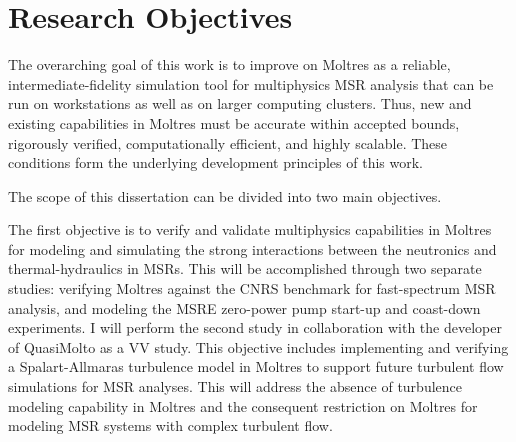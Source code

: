 
\section{Research Objectives}

The overarching goal of this work is to improve on Moltres as a reliable, intermediate-fidelity
simulation tool for multiphysics \gls{MSR} analysis that can be run on workstations as well as on
larger computing clusters. Thus, new and existing capabilities in Moltres must
be accurate within accepted bounds, rigorously verified, computationally efficient, and highly
scalable. These conditions form the underlying development principles of this work.

The scope of this dissertation can be divided into two main objectives.
%

    The first objective is to verify and validate multiphysics capabilities in Moltres for
    modeling and simulating
    the strong interactions between the neutronics and thermal-hydraulics in \glspl{MSR}. This
    will be accomplished through two separate studies: verifying Moltres against the CNRS
    benchmark \cite{tiberga_results_2020} for fast-spectrum \gls{MSR} analysis, and modeling the
    \gls{MSRE} zero-power pump start-up and coast-down experiments. I will perform the second study
    in collaboration with the developer of QuasiMolto \cite{reynolds_analysis_2023} as a \gls{VV}
    study.
%
    This objective includes implementing and verifying a Spalart-Allmaras turbulence model in
    Moltres to support future turbulent flow
    simulations for \gls{MSR} analyses. This will address the absence of turbulence modeling
    capability in Moltres and the consequent restriction on Moltres for modeling \gls{MSR} systems
    with complex turbulent flow.

